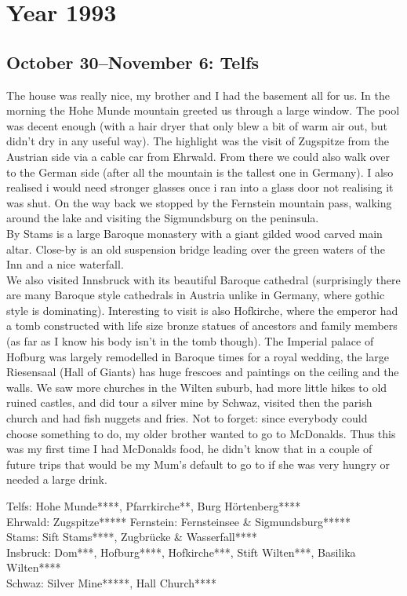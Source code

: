 \chapter{Year 1993}
\label{1993}

\section{October 30--November 6: Telfs}
\label{1993:Telfs}

The house was really nice, my brother and I had the basement all for us. In the morning the Hohe Munde mountain greeted us through a large window. The pool was decent enough (with a hair dryer that only blew a bit of warm air out, but didn't dry in any useful way).
The highlight was the visit of Zugspitze from the Austrian side via a cable car from Ehrwald. From there we could also walk over to the German side (after all the mountain is the tallest one in Germany). I also realised i would need stronger glasses once i ran into a glass door not realising it was shut. On the way back we stopped by the Fernstein mountain pass, walking around the lake and visiting the Sigmundsburg on the peninsula.\\
By Stams is a large Baroque monastery with a giant gilded wood carved main altar. Close-by is an old suspension bridge leading over the green waters of the Inn and a nice waterfall.\\
We also visited Innsbruck with its beautiful Baroque cathedral (surprisingly there are many Baroque style cathedrals in Austria unlike in Germany, where gothic style is dominating). Interesting to visit is also Hofkirche, where the emperor had a tomb constructed with life size bronze statues of ancestors and family members (as far as I know his body isn't in the tomb though). The Imperial palace of Hofburg was largely remodelled in Baroque times for a royal wedding, the large Riesensaal (Hall of Giants) has huge frescoes and paintings on the ceiling and the walls. We saw more churches in the Wilten suburb, had more little hikes to old ruined castles, and did tour a silver mine by Schwaz, visited then the parish church and had fish nuggets and fries.
Not to forget: since everybody could choose something to do, my older brother wanted to go to McDonalds. Thus this was my first time I had McDonalds food, he didn't know that in a couple of future trips that would be my Mum's default to go to if she was very hungry or needed a large drink.

Telfs: Hohe Munde****, Pfarrkirche**, Burg H\"ortenberg****\\
Ehrwald: Zugspitze*****
Fernstein: Fernsteinsee \& Sigmundsburg*****\\
Stams: Sift Stams****, Zugbr\"ucke \& Wasserfall****\\
Insbruck: Dom***, Hofburg****, Hofkirche***, Stift Wilten***, Basilika Wilten****\\
Schwaz: Silver Mine*****, Hall Church****

